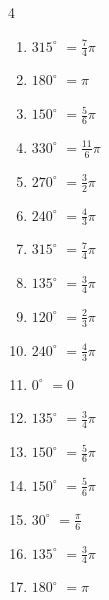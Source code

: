\begin{multicols}{4}
\begin{enumerate}
  \item $\displaystyle 315^{\circ}$
        $\displaystyle =\frac{7}{4}\pi$

  \item $\displaystyle 180^{\circ}$
        $\displaystyle =\pi$

\columnbreak %

  \item $\displaystyle 150^{\circ}$
        $\displaystyle =\frac{5}{6}\pi$

  \item $\displaystyle 330^{\circ}$
        $\displaystyle =\frac{11}{6}\pi$

  \item $\displaystyle 270^{\circ}$
        $\displaystyle =\frac{3}{2}\pi$

  \item $\displaystyle 240^{\circ}$
        $\displaystyle =\frac{4}{3}\pi$

  \item $\displaystyle 315^{\circ}$
        $\displaystyle =\frac{7}{4}\pi$

  \item $\displaystyle 135^{\circ}$
        $\displaystyle =\frac{3}{4}\pi$

  \item $\displaystyle 120^{\circ}$
        $\displaystyle =\frac{2}{3}\pi$

  \item $\displaystyle 240^{\circ}$
        $\displaystyle =\frac{4}{3}\pi$

  \item $\displaystyle 0^{\circ}$
        $\displaystyle =0$

  \item $\displaystyle 135^{\circ}$
        $\displaystyle =\frac{3}{4}\pi$

  \item $\displaystyle 150^{\circ}$
        $\displaystyle =\frac{5}{6}\pi$

  \item $\displaystyle 150^{\circ}$
        $\displaystyle =\frac{5}{6}\pi$

  \item $\displaystyle 30^{\circ}$
        $\displaystyle =\frac{\pi}{6}$

  \item $\displaystyle 135^{\circ}$
        $\displaystyle =\frac{3}{4}\pi$

  \item $\displaystyle 180^{\circ}$
        $\displaystyle =\pi$


\end{enumerate}
\end{multicols}
